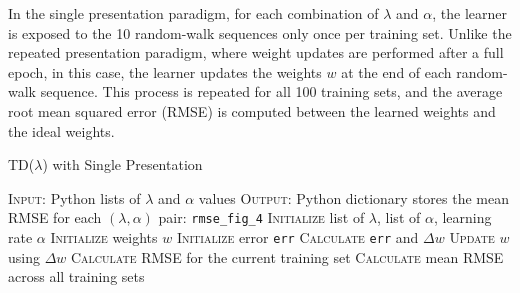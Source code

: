 \documentclass[lettersize,journal]{IEEEtran}
\begin{document}
In the single presentation paradigm, for each combination of $\lambda$ and $\alpha$, the learner is exposed to the 10 random-walk sequences only once per training set. Unlike the repeated presentation paradigm, where weight updates are performed after a full epoch, in this case, the learner updates the weights $w$ at the end of each random-walk sequence. This process is repeated for all 100 training sets, and the average root mean squared error (RMSE) is computed between the learned weights and the ideal weights. 

\begin{algorithm}[H]
\caption{TD($\lambda$) with Single Presentation}\label{alg:td_lambda_single}
\begin{algorithmic}
    \STATE
    \STATE \textsc{Input:} Python lists of $\lambda$ and $\alpha$ values
    \STATE \textsc{Output:} Python dictionary stores the mean RMSE for each $(\lambda, \alpha)$ pair: \texttt{rmse\_fig\_4}
    \STATE
    \STATE \hspace{0.5cm} \textsc{Initialize} list of $\lambda$, list of $\alpha$, learning rate $\alpha$
                \STATE \hspace{0.5cm} \textsc{Initialize} weights $w$
                    \STATE \hspace{1cm} \textsc{Initialize} error \texttt{err}
                        \STATE \hspace{1.5cm} \textsc{Calculate} \texttt{err} and $\Delta w$
                    \ENDFOR
                    \STATE \hspace{1cm} \textsc{Update} $w$ using $\Delta w$
                \ENDFOR
                \STATE \hspace{0.5cm} \textsc{Calculate} RMSE for the current training set
            \ENDFOR
            \STATE \hspace{0.5cm} \textsc{Calculate} mean RMSE across all training sets
        \ENDFOR
    \ENDFOR
\end{algorithmic}
\end{algorithm}
\end{document}
